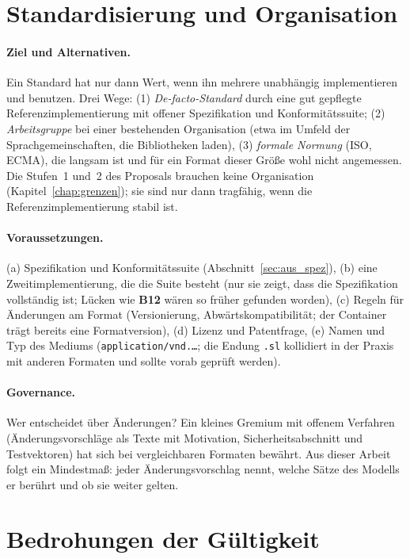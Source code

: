 \documentclass[a4paper,12pt,twoside]{report}
\DeclareRobustCommand{\_}{\ifmmode\mbox{\textunderscore}\else\textunderscore\allowbreak{}\fi}
\theoremstyle{definition}
\newcommand{\Bf}[1]{\textbf{B#1}}
\begin{document}
\section{Standardisierung und Organisation}
\label{sec:aus_standard}

\paragraph{Ziel und Alternativen.} Ein Standard hat nur dann Wert, wenn ihn mehrere unabhängig implementieren und benutzen. Drei Wege: (1) \emph{De-facto-Standard} durch eine gut gepflegte Referenzimplementierung mit offener Spezifikation und Konformitätssuite; (2) \emph{Arbeitsgruppe} bei einer bestehenden Organisation (etwa im Umfeld der Sprachgemeinschaften, die Bibliotheken laden), (3) \emph{formale Normung} (ISO, ECMA), die langsam ist und für ein Format dieser Größe wohl nicht angemessen. Die Stufen~1 und~2 des Proposals brauchen keine Organisation (Kapitel~\ref{chap:grenzen}); sie sind nur dann tragfähig, wenn die Referenzimplementierung stabil ist.

\paragraph{Voraussetzungen.} (a) Spezifikation und Konformitätssuite (Abschnitt~\ref{sec:aus_spez}), (b) eine Zweitimplementierung, die die Suite besteht (nur sie zeigt, dass die Spezifikation vollständig ist; Lücken wie \Bf{12} wären so früher gefunden worden), (c) Regeln für Änderungen am Format (Versionierung, Abwärtskompatibilität; der Container trägt bereits eine Formatversion), (d) Lizenz und Patentfrage, (e) Namen und Typ des Mediums (\texttt{application/vnd.\dots}; die Endung \texttt{.sl} kollidiert in der Praxis mit anderen Formaten und sollte vorab geprüft werden).

\paragraph{Governance.} Wer entscheidet über Änderungen? Ein kleines Gremium mit offenem Verfahren (Änderungsvorschläge als Texte mit Motivation, Sicherheitsabschnitt und Testvektoren) hat sich bei vergleichbaren Formaten bewährt. Aus dieser Arbeit folgt ein Mindestmaß: jeder Änderungsvorschlag nennt, welche Sätze des Modells er berührt und ob sie weiter gelten.

\section{Bedrohungen der Gültigkeit}
\end{document}
